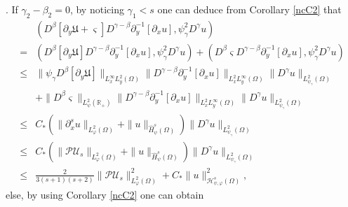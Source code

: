 \documentclass{amsart}
\numberwithin{equation}{section}
\begin{document}
.
If $\gamma_{2}-\beta_{2}=0$, by noticing $\gamma_{1}<s$ one can deduce from Corollary \ref{ncC2} that
\begin{align*}
&(D^{\beta}[\partial_{y}\mathfrak{U}+\varsigma]D^{\gamma-\beta}\partial_{y}^{-1}[\partial_{x}u],\psi_{\gamma}^{2}D^{\gamma}u)\\
=& (D^{\beta}[\partial_{y}\mathfrak{U}]D^{\gamma-\beta}\partial_{y}^{-1}[\partial_{x}u],\psi_{\gamma}^{2}D^{\gamma}u)
  +(D^{\beta}\varsigma D^{\gamma-\beta}\partial_{y}^{-1}[\partial_{x}u],\psi_{\gamma}^{2}D^{\gamma}u)\\
\leq& \|\psi_{\gamma}D^{\beta}[\partial_{y}\mathfrak{U}]\|_{L_{x}^{\infty}L_{y}^{2}(\Omega)}
      \|D^{\gamma-\beta}\partial_{y}^{-1}[\partial_{x}u]\|_{L_{x}^{2}L_{y}^{\infty}(\Omega)}
      \|D^{\gamma}u\|_{L_{\psi_{\gamma}}^{2}(\Omega)}\\
    &+\|D^{\beta}\varsigma\|_{L_{\psi}^{2}(\mathbb{R}_{+})}
      \|D^{\gamma-\beta}\partial_{y}^{-1}[\partial_{x}u]\|_{L_{x}^{2}L_{y}^{\infty}(\Omega)}
      \|D^{\gamma}u\|_{L_{\psi_{\gamma}}^{2}(\Omega)}\\
\leq& C_{*}\left(\|\partial_{x}^{s}u\|_{L_{\varphi}^{2}(\Omega)}+\|u\|_{\hat{H}_{\psi}^{s}(\Omega)}\right)
       \|D^{\gamma}u\|_{L_{\psi_{\gamma}}^{2}(\Omega)}\\
\leq& C_{*}\left(\|\mathcal{P}\mathcal{U}_{s}\|_{L_{\varphi}^{2}(\Omega)}+\|u\|_{\hat{H}_{\psi}^{s}(\Omega)}\right)
       \|D^{\gamma}u\|_{L_{\psi_{\gamma}}^{2}(\Omega)}\\
\leq& \frac{2}{3(s+1)(s+2)}\|\mathcal{P}\mathcal{U}_{s}\|_{L_{\varphi}^{2}(\Omega)}^{2}
     +C_{*}\|u\|_{\mathcal{H}_{\psi,\varphi}^{s}(\Omega)}^{2},
\end{align*}
else, by using Corollary \ref{ncC2} one can obtain
\end{document}
